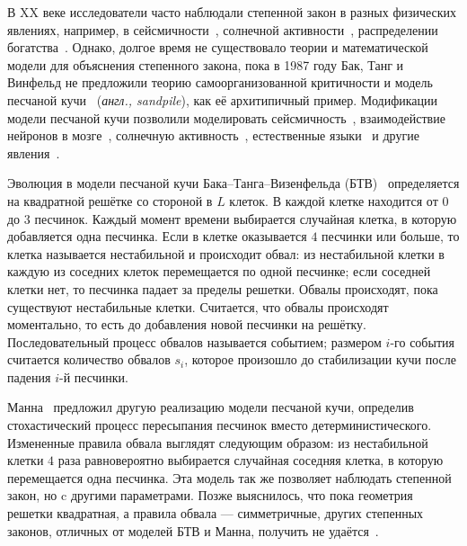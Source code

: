 В XX веке исследователи часто наблюдали степенной закон в разных физических явлениях, например, в сейсмичности~\cite{Burridge1967ModelAT}, солнечной активности~\cite{Dennis1985SolarHX}, распределении богатства~\cite{Levy1997NEWEF}. Однако, долгое время не существовало теории и математической модели для объяснения степенного закона, пока в 1987 году Бак, Танг и Винфельд не предложили теорию самоорганизованной критичности и модель песчаной кучи~\cite{btw} (\textit{англ., sandpile}), как её архитипичный пример. Модификации модели песчаной кучи позволили моделировать сейсмичность~\cite{Khodaverdian2016,TURCOTTE1999275}, взаимодействие нейронов в мозге~\cite{Bak1996HowNW}, солнечную активность~\cite{Aschwanden2021SelforganizedCI}, естественные языки~\cite{Gromov2020} и другие явления~\cite{bunde,Kalinin2021,podgornik}.

Эволюция в модели песчаной кучи Бака–Танга–Визенфельда (БТВ)~\cite{btw} определяется на квадратной решётке со стороной в $L$ клеток. В каждой клетке находится от $0$ до $3$ песчинок. Каждый момент времени выбирается случайная клетка, в которую добавляется одна песчинка. Если в клетке оказывается $4$ песчинки или больше, то клетка называется нестабильной и происходит обвал: из нестабильной клетки в каждую из соседних клеток перемещается по одной песчинке; если соседней клетки нет, то песчинка падает за пределы решетки. Обвалы происходят, пока существуют нестабильные клетки. Считается, что обвалы происходят моментально, то есть до добавления новой песчинки на решётку. Последовательный процесс обвалов называется событием; размером $i$-го события считается количество обвалов $s_i$, которое произошло до стабилизации кучи после падения $i$-й песчинки.

Манна~\cite{manna} предложил другую реализацию модели песчаной кучи, определив стохастический процесс пересыпания песчинок вместо детерминистического. Измененные правила обвала выглядят следующим образом: из нестабильной клетки $4$ раза равновероятно выбирается случайная соседняя клетка, в которую перемещается одна песчинка. Эта модель так же позволяет наблюдать степенной закон, но c другими параметрами. Позже выяснилось, что пока геометрия решетки квадратная, а правила обвала --- симметричные, других степенных законов, отличных от моделей БТВ и Манна, получить не удаётся~\cite{BenHur1996,Dhar2006}.

